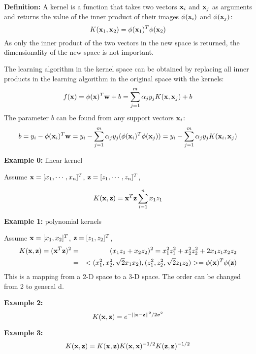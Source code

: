 {\bf Definition: } A kernel is a function that takes two vectors ${\bf x}_i$ 
and ${\bf x}_j$ as arguments and returns the value of the inner product of
their images $\phi({\bf x}_i)$ and $\phi({\bf x}_j)$:
\[	
K({\bf x}_1,{\bf x}_2)=\phi({\bf x}_1)^T\phi({\bf x}_2) 
\]
As only the inner product of the two vectors in the new space is returned,
the dimensionality of the new space is not important. 

The learning algorithm in the kernel space can be obtained by replacing
all inner products in the learning algorithm in the original space with 
the kernels:
\[ 
f({\bf x})=\phi({\bf x})^T {\bf w}+b=\sum_{j=1}^m \alpha_j y_j K({\bf x},{\bf x}_j)+b	
\]
The parameter $b$ can be found from any support vectors ${\bf x}_i$:
\[ 
b=y_i-\phi({\bf x}_i)^T {\bf w}=y_i-\sum_{j=1}^m  \alpha_j y_j 
(\phi({\bf x}_i)^T \phi({\bf x}_j))=y_i-\sum_{j=1}^m  \alpha_j y_j K({\bf x}_i,{\bf x}_j) 
\]

{\bf Example 0:} linear kernel

Assume ${\bf x}=[x_1,\cdots,x_n]^T$, ${\bf z}=[z_1,\cdots,z_n]^T$, 

\[	K({\bf x},{\bf z})={\bf x}^T {\bf z}\sum_{i=1}^n x_1z_1	\]

{\bf Example 1:} polynomial kernels

Assume ${\bf x}=[x_1,x_2]^T$, ${\bf z}=[z_1,z_2]^T$, 
\begin{eqnarray}
	K({\bf x},{\bf z})=({\bf x}^T{\bf z})^2&=&(x_1z_1+x_2z_2)^2
        =x_1^2z_1^2+x_2^2z_2^2+2x_1z_1x_2z_2
	\nonumber \\
	&=&<(x_1^2,x_2^2,\sqrt{2}x_1x_2),(z_1^2,z_2^2,\sqrt{2}z_1z_2)>
	=\phi({\bf x})^T \phi({\bf z})
	\nonumber
\end{eqnarray}
This is a mapping from a 2-D space to a 3-D space. The order can be changed 
from 2 to general d.

{\bf Example 2:} 
\[	K({\bf x},{\bf z})=e^{-||{\bf x}-{\bf z}||^2/2\sigma^2}	\]

{\bf Example 3:} 
\[	K({\bf x},{\bf z})=K({\bf x},{\bf z})K({\bf x},{\bf x})^{-1/2}K({\bf z},{\bf z})^{-1/2}	\]



